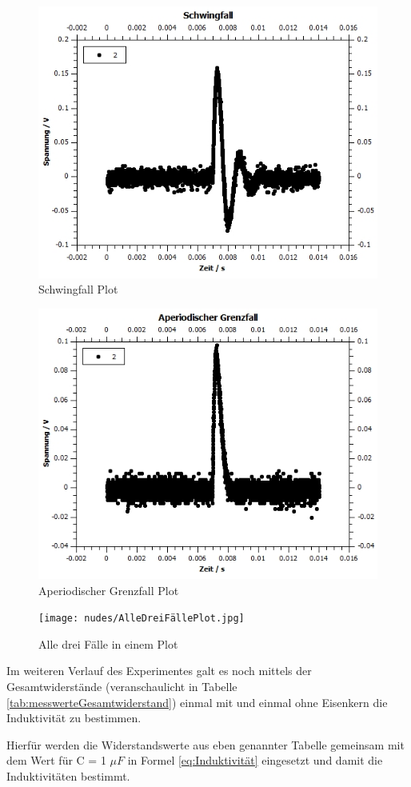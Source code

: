 \documentclass[12pt,a4paper,twoside]{article}
\begin{document}
\begin{figure}[H]
    \centering
    \includegraphics[width=0.6\linewidth, angle=0]{nudes/SchwingfallPlot.jpg}
    \caption{Schwingfall Plot}
    \label{fig:SchwingfallPlot}
\end{figure}

\begin{figure}[H]
    \centering
    \includegraphics[width=0.6\linewidth, angle=0]{nudes/Aperiodischer Grenzfall.jpg}
    \caption{Aperiodischer Grenzfall Plot}
    \label{fig:AperiodischerGrenzfallPlot}
\end{figure}

\begin{figure}[H]
    \centering
    \texttt{[image: nudes/AlleDreiFällePlot.jpg]}
    \caption{Alle drei Fälle in einem Plot}
    \label{fig:AlleDreiFälle}
\end{figure}

\noindent
Im weiteren Verlauf des Experimentes galt es noch mittels der Gesamtwiderstände (veranschaulicht in Tabelle \ref{tab:messwerteGesamtwiderstand}) einmal mit und einmal ohne Eisenkern die Induktivität zu bestimmen.

Hierfür werden die Widerstandswerte aus eben genannter Tabelle gemeinsam mit dem Wert für C = 1 $\mu F$ in Formel \ref{eq:Induktivität} eingesetzt und damit die Induktivitäten bestimmt.
\end{document}
